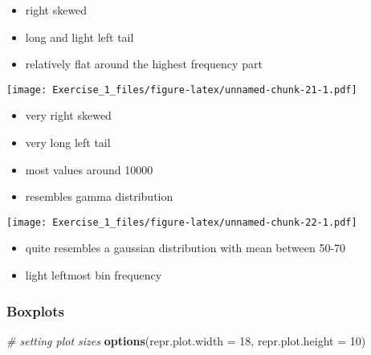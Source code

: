 \documentclass[]{article}
\newenvironment{Shaded}{\begin{snugshade}}{\end{snugshade}}
\newcommand{\CommentTok}[1]{\textcolor[rgb]{0.56,0.35,0.01}{\textit{#1}}}
\newcommand{\DataTypeTok}[1]{\textcolor[rgb]{0.13,0.29,0.53}{#1}}
\newcommand{\DecValTok}[1]{\textcolor[rgb]{0.00,0.00,0.81}{#1}}
\newcommand{\KeywordTok}[1]{\textcolor[rgb]{0.13,0.29,0.53}{\textbf{#1}}}
\newcommand{\NormalTok}[1]{#1}
\newcommand{\OperatorTok}[1]{\textcolor[rgb]{0.81,0.36,0.00}{\textbf{#1}}}
\providecommand{\tightlist}{%
  \setlength{\itemsep}{0pt}\setlength{\parskip}{0pt}}
\begin{document}
\begin{itemize}
\tightlist
\item
  right skewed
\item
  long and light left tail
\item
  relatively flat around the highest frequency part
\end{itemize}

\begin{Shaded}
\end{Shaded}

\texttt{[image: Exercise\_1\_files/figure-latex/unnamed-chunk-21-1.pdf]}

\begin{itemize}
\tightlist
\item
  very right skewed
\item
  very long left tail
\item
  most values around 10000
\item
  resembles gamma distribution
\end{itemize}

\begin{Shaded}
\end{Shaded}

\texttt{[image: Exercise\_1\_files/figure-latex/unnamed-chunk-22-1.pdf]}

\begin{itemize}
\tightlist
\item
  quite resembles a gaussian distribution with mean between 50-70
\item
  light leftmost bin frequency
\end{itemize}

\hypertarget{boxplots}{%
\subsubsection{Boxplots}\label{boxplots}}

\begin{Shaded}
\begin{Highlighting}[]
\CommentTok{# setting plot sizes}
\KeywordTok{options}\NormalTok{(}\DataTypeTok{repr.plot.width =} \DecValTok{18}\NormalTok{, }\DataTypeTok{repr.plot.height =} \DecValTok{10}\NormalTok{)}
\end{Highlighting}
\end{Shaded}
\end{document}
